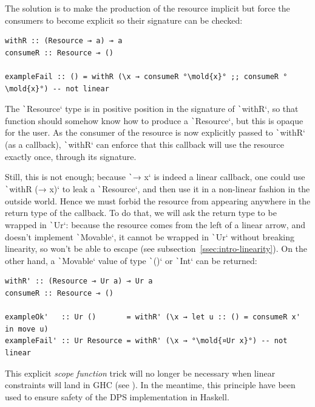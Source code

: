 \documentclass[english]{jflart}
\newcommand{\mold}[1]{\colorbox{red!50}{#1}}
\newlength{\currentparskip}
\newenvironment{unbreakable}
{%
  \setlength{\currentparskip}{\parskip}%
  \setlength{\parskip}{\currentparskip}%
  \par\vspace{0.5\baselineskip}%
  \noindent\begin{minipage}{\textwidth}%
    \setlength{\parskip}{\currentparskip}%
}
{%
  \end{minipage}%
  \par\vspace{0.5\baselineskip}%
}
\begin{document}
The solution is to make the production of the resource implicit but force the consumers to become explicit so their signature can be checked:

\begin{unbreakable}
{\small
\begin{verbatim}
withR :: (Resource ⊸ a) ⊸ a
consumeR :: Resource ⊸ ()

exampleFail :: () = withR (\x → consumeR °\mold{x}° ;; consumeR °\mold{x}°) -- not linear
\end{verbatim}
}
\end{unbreakable}

The \texttt`Resource` type is in positive position in the signature of \texttt`withR`, so that function should somehow know how to produce a \texttt`Resource`, but this is opaque for the user. As the consumer of the resource is now explicitly passed to \texttt`withR` (as a callback), \texttt`withR` can enforce that this callback will use the resource exactly once, through its signature.

Still, this is not enough; because \texttt`\x → x` is indeed a linear callback, one could use \texttt`withR (\x → x)` to leak a \texttt`Resource`, and then use it in a non-linear fashion in the outside world. Hence we must forbid the resource from appearing anywhere in the return type of the callback. To do that, we will ask the return type to be wrapped in \texttt`Ur`: because the resource comes from the left of a linear arrow, and doesn't implement \texttt`Movable`, it cannot be wrapped in \texttt`Ur` without breaking linearity, so won't be able to escape (see subsection~\ref{ssec:intro-linearity}). On the other hand, a \texttt`Movable` value of type \texttt`()` or \texttt`Int` can be returned:
\begin{unbreakable}
{\small
\begin{verbatim}
withR' :: (Resource ⊸ Ur a) ⊸ Ur a
consumeR :: Resource ⊸ ()

exampleOk'   :: Ur ()       = withR' (\x → let u :: () = consumeR x' in move u)
exampleFail' :: Ur Resource = withR' (\x → °\mold{¤Ur x}°) -- not linear
\end{verbatim}
}
\end{unbreakable}

This explicit \emph{scope function} trick will no longer be necessary when linear constraints will land in GHC (see \cite{spiwack_linearly_2022}). In the meantime, this principle have been used to ensure safety of the DPS implementation in Haskell.
\end{document}
